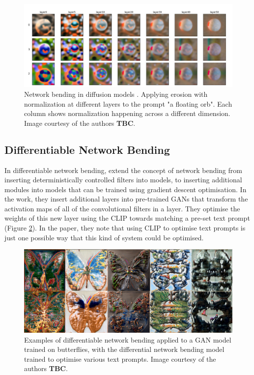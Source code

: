\begin{figure}[!htb]
    \centering
    \captionsetup{justification=centering}
    \includegraphics[width=1\textwidth]{figures/c7_impact/net-bend-technical/net-bend-diffusion.png}
    \caption[Network bending in diffusion models]{Network bending in diffusion models \citep{dzwonczyk2024network}. Applying erosion with normalization at different layers to the prompt "a floating orb". Each column shows normalization happening across a different dimension. Image courtesy of the authors \textbf{TBC}.}
    \label{fig:c7:net-bend-diffusion}
\end{figure}

\subsection{Differentiable Network Bending}

In differentiable network bending, \cite{aldegheri2023hacking} extend the concept of network bending from inserting deterministically controlled filters into models, to inserting additional modules into models that can be trained using gradient descent optimisation.
In the work, they insert additional layers into pre-trained GANs that transform the activation maps of all of the convolutional filters in a layer.
They optimise the weights of this new layer using the CLIP \citep{radford2021learning} towards matching a pre-set text prompt (Figure \ref{fig:c7:differential-net-bend}).
In the paper, they note that using CLIP to optimise text prompts is just one possible way that this kind of system could be optimised. 

\begin{figure}[!htb]
    \centering
    \captionsetup{justification=centering}
    \includegraphics[width=1\textwidth]{figures/c7_impact/net-bend-technical/diff-net-bend.png}
    \caption[Differential network bending]{Examples of differentiable network bending \citep{aldegheri2023hacking} applied to a GAN model trained on butterflies, with the differential network bending model trained to optimise various text prompts. Image courtesy of the authors \textbf{TBC}.}
    \label{fig:c7:differential-net-bend}
\end{figure}


